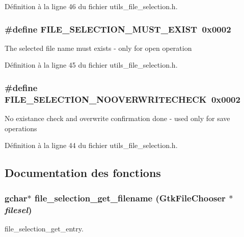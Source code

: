 Définition à la ligne 46 du fichier utils\_\-file\_\-selection.h.

\subsubsection[{FILE\_\-SELECTION\_\-MUST\_\-EXIST}]{\setlength{\rightskip}{0pt plus 5cm}\#define FILE\_\-SELECTION\_\-MUST\_\-EXIST~0x0002}\label{utils__file__selection_8h_a36fd252876e7e8b0fb7c824a4016f168}
The selected file name must exists -\/ only for open operation 

Définition à la ligne 45 du fichier utils\_\-file\_\-selection.h.

\subsubsection[{FILE\_\-SELECTION\_\-NOOVERWRITECHECK}]{\setlength{\rightskip}{0pt plus 5cm}\#define FILE\_\-SELECTION\_\-NOOVERWRITECHECK~0x0002}\label{utils__file__selection_8h_a77427550083b33e37511110084ffa118}
No existance check and overwrite confirmation done -\/ used only for save operations 

Définition à la ligne 44 du fichier utils\_\-file\_\-selection.h.



\subsection{Documentation des fonctions}
\subsubsection[{file\_\-selection\_\-get\_\-filename}]{\setlength{\rightskip}{0pt plus 5cm}gchar$\ast$ file\_\-selection\_\-get\_\-filename (GtkFileChooser $\ast$ {\em filesel})}\label{utils__file__selection_8h_a553733327d0e98dc761f3eec04c9d3d3}
file\_\-selection\_\-get\_\-entry.

